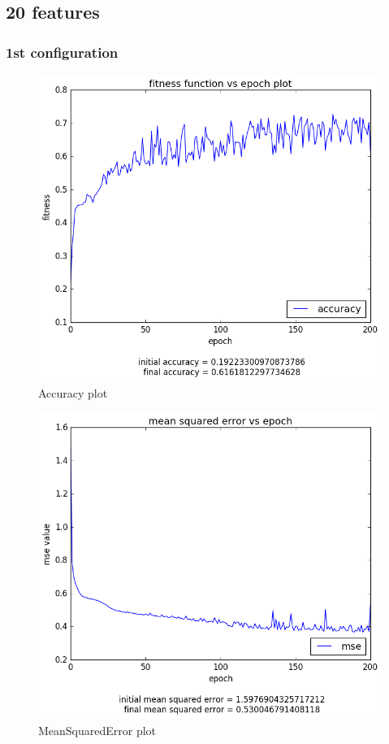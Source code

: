 \documentclass[12pt,a4paper]{article}
\begin{document}
\subsection{20 features}
\subsubsection{1st configuration}
\begin{figure}[H]
\centering
\includegraphics[scale=0.4]{img/20_acc.png}
\caption{Accuracy plot}
\end{figure}
\begin{figure}[H]
\centering
\includegraphics[scale=0.4]{img/20_mse.png}
\caption{MeanSquaredError plot}
\end{figure}
\end{document}
